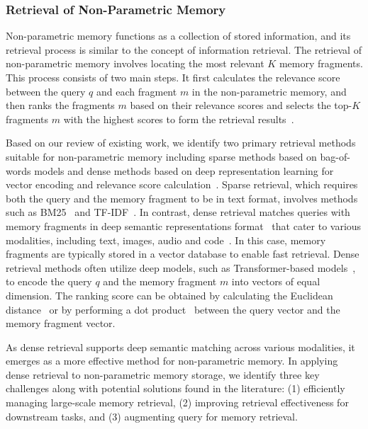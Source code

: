 \documentclass[journal,hideappendix]{vgtc}
\begin{document}
\subsubsection{Retrieval of Non-Parametric Memory}
\label{sec:AI_memory:non_parametric:memory_retrieval}

Non-parametric memory functions as a collection of stored information, and its retrieval process is similar to the concept of information retrieval. The retrieval of non-parametric memory involves locating the most relevant $K$ memory fragments. This process consists of two main steps. It first calculates the relevance score between the query $q$ and each fragment $m$ in the non-parametric memory, and then ranks the fragments $m$ based on their relevance scores and selects the top-$K$ fragments $m$ with the highest scores to form the retrieval results~\cite{baeza1999modern,manning2008introduction,izacard2022unsupervised}.

Based on our review of existing work, we identify two primary retrieval methods suitable for non-parametric memory including sparse methods based on bag-of-words models and dense methods based on deep representation learning for vector encoding and relevance score calculation~\cite{arabzadeh2021predicting,luan2021sparse,izacard2022unsupervised,mandikal2024sparse}. Sparse retrieval, which requires both the query and the memory fragment to be in text format, involves methods such as BM25~\cite{robertson2004simple,bm252009robertson} and TF-IDF~\cite{sparck1972statistical}. In contrast, dense retrieval matches queries with memory fragments in deep semantic representations format~\cite{radford2018improving,kenton2019bert} that cater to various modalities, including text, images, audio and code~\cite{codebert2020zhangyin,clip2021radford,yusong2023audio}. In this case, memory fragments are typically stored in a vector database to enable fast retrieval. Dense retrieval methods often utilize deep models, such as Transformer-based models~\cite{vaswani2017attention}, to encode the query $q$ and the memory fragment $m$ into vectors of equal dimension. 
The ranking score can be obtained by calculating the Euclidean distance~\cite{danielsson1980euclidean} or by performing a dot product~\cite{izacard2022unsupervised} between the query vector and the memory fragment vector.

As dense retrieval supports deep semantic matching across various modalities, it emerges as a more effective method for non-parametric memory. 
In applying dense retrieval to non-parametric memory storage, we identify three key challenges along with potential solutions found in the literature: (1) efficiently managing large-scale memory retrieval, (2) improving retrieval effectiveness for downstream tasks, and (3) augmenting query for memory retrieval.
\end{document}
